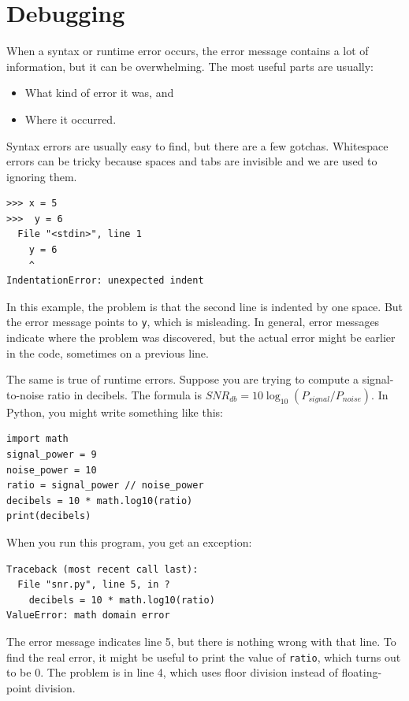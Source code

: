 \documentclass[10pt]{book}
\begin{document}
\section{Debugging}
\label{whitespace}

When a syntax or runtime error occurs, the error message contains
a lot of information, but it can be overwhelming.  The most
useful parts are usually:

\begin{itemize}

\item What kind of error it was, and

\item Where it occurred.

\end{itemize}

Syntax errors are usually easy to find, but there are a few
gotchas.  Whitespace errors can be tricky because spaces and
tabs are invisible and we are used to ignoring them.

\begin{verbatim}
>>> x = 5
>>>  y = 6
  File "<stdin>", line 1
    y = 6
    ^
IndentationError: unexpected indent
\end{verbatim}
%
In this example, the problem is that the second line is indented by
one space.  But the error message points to {\tt y}, which is
misleading.  In general, error messages indicate where the problem was
discovered, but the actual error might be earlier in the code,
sometimes on a previous line.

The same is true of runtime errors.  Suppose you are trying
to compute a signal-to-noise ratio in decibels.  The formula
is $SNR_{db} = 10 \log_{10} (P_{signal} / P_{noise})$.  In Python,
you might write something like this:

\begin{verbatim}
import math
signal_power = 9
noise_power = 10
ratio = signal_power // noise_power
decibels = 10 * math.log10(ratio)
print(decibels)
\end{verbatim}
%
When you run this program, you get an exception:
%

\begin{verbatim}
Traceback (most recent call last):
  File "snr.py", line 5, in ?
    decibels = 10 * math.log10(ratio)
ValueError: math domain error
\end{verbatim}
%
The error message indicates line 5, but there is nothing
wrong with that line.  To find the real error, it might be
useful to print the value of {\tt ratio}, which turns out to
be 0.  The problem is in line 4, which uses floor division
instead of floating-point division.
\end{document}

